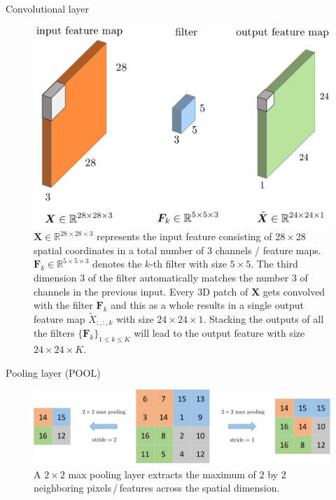 \documentclass[presentation]{beamer}
\begin{document}
\begin{frame}{Convolutional layer}
    \begin{figure}
    \centering
    \includegraphics[height=0.4\textwidth]{convolution_3D}

    \caption{$\bm{X}\in \mathbb{R}^{28\times 28 \times 3}$ represents the input feature consisting of $28 \times 28$ spatial coordinates in a total number of 3  channels / feature maps. $\bm{F}_{k}\in\mathbb{R}^{5\times 5 \times 3}$ denotes the $k$-th filter with size $5\times 5$. The third dimension $3$ of the filter automatically matches the number $3$  of channels in the previous input. Every 3D patch of $\bm{X}$ gets convolved with the filter $\bm{F}_{k}$ and this as a whole results in a single output feature map $\tilde{X}_{:,:,k}$ with size $24\times 24\times 1$. Stacking the outputs of all the filters $\{\bm{F}_{k}\}_{1\leq k\leq K}$ will lead to the output feature with size $24\times 24\times K$. \label{fig:Convolution-operation}}

    \end{figure}
\end{frame}


\begin{frame}{Pooling layer (POOL)}
    \begin{figure}
    \centering
    
    \includegraphics[width=0.95 \linewidth]{pooling}\caption{A $2\times 2$ max pooling layer extracts the maximum of 2 by 2 neighboring pixels$\,$/$\,$features across the spatial dimension. }\label{fig:pooling}
    \end{figure}
\end{frame}
\end{document}
